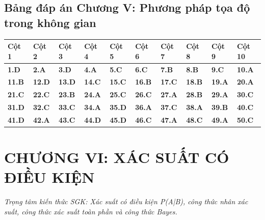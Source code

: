 \documentclass[11pt,a4paper]{article}
\begin{document}
\subsection*{\color{primary} Bảng đáp án Chương V: Phương pháp tọa độ trong không gian}
\begin{center}
\renewcommand{\arraystretch}{1.25}
\begin{tabularx}{\textwidth}{*{10}{>{\centering\arraybackslash}X}}
\toprule
\textbf{\color{primary} Cột 1} & \textbf{\color{primary} Cột 2} & \textbf{\color{primary} Cột 3} & \textbf{\color{primary} Cột 4} & \textbf{\color{primary} Cột 5} & \textbf{\color{primary} Cột 6} & \textbf{\color{primary} Cột 7} & \textbf{\color{primary} Cột 8} & \textbf{\color{primary} Cột 9} & \textbf{\color{primary} Cột 10} \\
\midrule
\textbf{1.D} & \textbf{2.A} & \textbf{3.D} & \textbf{4.A} & \textbf{5.C} & \textbf{6.C} & \textbf{7.B} & \textbf{8.B} & \textbf{9.C} & \textbf{10.A} \\
\rowcolor{rowtint} \textbf{11.B} & \textbf{12.D} & \textbf{13.D} & \textbf{14.C} & \textbf{15.C} & \textbf{16.B} & \textbf{17.C} & \textbf{18.B} & \textbf{19.A} & \textbf{20.A} \\
\textbf{21.C} & \textbf{22.C} & \textbf{23.B} & \textbf{24.A} & \textbf{25.C} & \textbf{26.C} & \textbf{27.A} & \textbf{28.B} & \textbf{29.A} & \textbf{30.C} \\
\rowcolor{rowtint} \textbf{31.D} & \textbf{32.C} & \textbf{33.C} & \textbf{34.A} & \textbf{35.D} & \textbf{36.A} & \textbf{37.C} & \textbf{38.A} & \textbf{39.B} & \textbf{40.C} \\
\textbf{41.D} & \textbf{42.A} & \textbf{43.C} & \textbf{44.D} & \textbf{45.D} & \textbf{46.C} & \textbf{47.A} & \textbf{48.C} & \textbf{49.A} & \textbf{50.C} \\
\bottomrule
\end{tabularx}
\end{center}\vspace{10pt}
\section*{\color{primary} CHƯƠNG VI: XÁC SUẤT CÓ ĐIỀU KIỆN}
\textit{Trọng tâm kiến thức SGK: Xác suất có điều kiện P(A|B), công thức nhân xác suất, công thức xác suất toàn phần và công thức Bayes.}\par\vspace{4pt}
\end{document}

